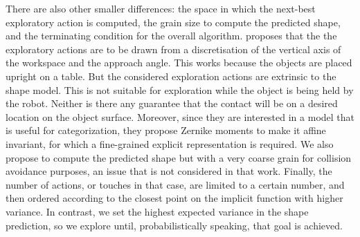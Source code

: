There are also other smaller differences: the space in which the next-best exploratory action is computed, the grain size to compute the predicted shape, and the terminating condition for the overall algorithm.
\cite{Bjorkman2013Enhancing}
proposes that the the exploratory actions are to be drawn from a discretisation of the vertical axis of the workspace and the approach angle. This works because the objects are placed upright on a table. But the considered exploration actions are extrinsic to the shape model. This is not suitable for exploration while the object is being held by the robot. Neither is there any guarantee that the contact will be on a desired location on the object surface. Moreover, since they are interested in a model that is useful for categorization, they propose Zernike moments to make it affine invariant, for which a fine-grained explicit representation is required. We also propose to compute the predicted shape but with a very coarse grain for collision avoidance purposes, an issue that is not considered in that work. Finally, the number of actions, or touches in that case, are limited to a certain number, and then ordered according to the closest point on the implicit function with higher variance. In contrast, we set the highest expected variance in the shape prediction, so we explore until, probabilistically speaking, that goal is achieved.
